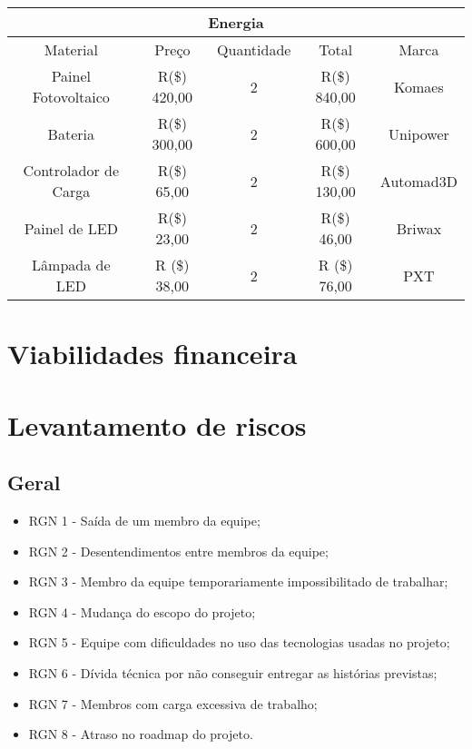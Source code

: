 \begin{table}[h]
\begin{tabular}{|c|c|c|c|c|}
\hline
\multicolumn{5}{|c|}{Energia}                                                 \\ \hline
Material             & Preço         & Quantidade & Total         & Marca     \\ \hline
Painel Fotovoltaico  & R(\$) 420,00  & 2          & R(\$) 840,00  & Komaes    \\ \hline
Bateria              & R(\$) 300,00  & 2          & R(\$) 600,00  & Unipower  \\ \hline
Controlador de Carga & R(\$) 65,00  & 2          & R(\$) 130,00  & Automad3D \\ \hline
Painel de LED        & R(\$) 23,00  & 2          & R(\$) 46,00 & Briwax    \\ \hline
Lâmpada de LED       & R (\$) 38,00 & 2          & R (\$) 76,00 & PXT         \\ \hline
\end{tabular}
\end{table}

\section{Viabilidades financeira}
\section{Levantamento de riscos}
\subsection{Geral}

\begin{itemize}
    \item RGN 1 - Saída de um membro da equipe;
    \item RGN 2 - Desentendimentos entre membros da equipe;
    \item RGN 3 - Membro da equipe temporariamente impossibilitado de trabalhar;
    \item RGN 4 - Mudança do escopo do projeto;
    \item RGN 5 - Equipe com dificuldades no uso das tecnologias usadas no projeto;
    \item RGN 6 - Dívida técnica por não conseguir entregar as histórias previstas;
    \item RGN 7 - Membros com carga excessiva de trabalho;
    \item RGN 8 - Atraso no roadmap do projeto.
\end{itemize}

